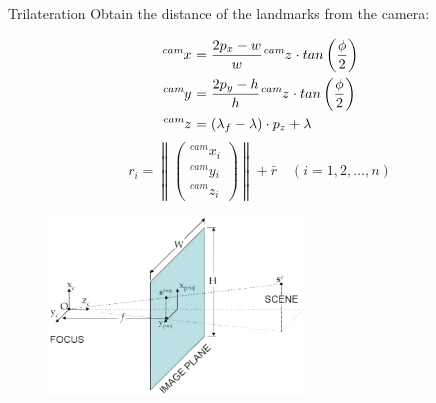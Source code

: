 \documentclass[10pt]{beamer}
\newcommand\norm[1]{\left\lVert#1\right\rVert}
\begin{document}
    \begin{frame}[fragile]{Trilateration}
        Obtain the distance of the landmarks from the camera:
        \vspace{-0.6cm}
        \begin{multicols}{2}
            \begin{align*}
                \tensor[^{cam}]{x}{} &= \frac{2 p_x - w}{w} \tensor[^{cam}]{z}{} \cdot tan\left(\frac{\phi}{2}\right) \\
                \tensor[^{cam}]{y}{} &= \frac{2 p_y - h}{h} \tensor[^{cam}]{z}{} \cdot tan\left(\frac{\phi}{2}\right) \\
                \tensor[^{cam}]{z}{} &= (\lambda_f - \lambda) \cdot p_z + \lambda \\
            \end{align*}\break
            \begin{equation*}
                r_i =
                \norm{
                    \begin{pmatrix}
                        ^{cam}{x}{_i} \\
                        ^{cam}{y}{_i} \\
                        ^{cam}{z}{_i}
                    \end{pmatrix}
                    } + \bar{r} \quad (i = 1, 2, \dots, n)
            \end{equation*}
        \end{multicols}
        \vspace{-1.25cm}
        \begin{figure}
            \includegraphics[width=\textwidth,height=4.75cm,keepaspectratio]{images/projective-camera.png}
        \end{figure}
    \end{frame}
\end{document}
